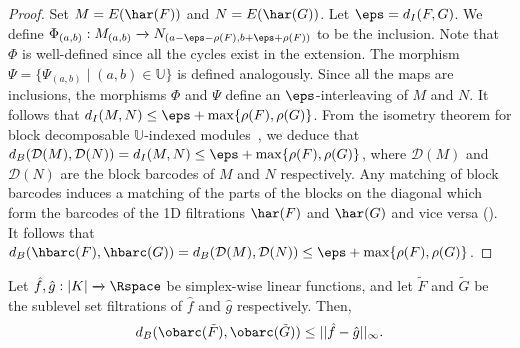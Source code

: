 \begin{proof}
    
    Set $M=E(\har(F))$ and $N=E(\har(G))$.  Let $\eps = d_{I}(F,G)$. We define $\Phi_{(a,b)}: M_{(a,b)} \xrightarrow{} N_{(a-\eps-\rho(F), b+\eps+\rho(F))}$ to be the inclusion. Note that $\Phi$ is well-defined since all the cycles exist in the extension. %
    The morphism $\Psi = \{ \Psi_{(a,b)}\mid (a,b)\in \mathbb{U} \}$ is defined analogously. Since all the maps are inclusions, the morphisms $\Phi$ and $\Psi$ define an $\eps$-interleaving of $M$ and $N$. It follows that $d_I (M,N) \leq \eps+\max \{\rho(F), \rho(G) \}$.
    From the isometry theorem for block decomposable $\mathbb{U}$-indexed modules~\cite{bjerkevik2021stability,botnan2018algebraic}, we deduce that $d_B( {\mathcal{D}} (M), {\mathcal{D}} (N)) = d_I(M,N) \leq \eps +\max \{\rho(F), \rho(G) \}$, where ${\mathcal{D}}(M)$ and ${\mathcal{D}}(N)$ are the block barcodes of $M$ and $N$ respectively. Any matching of block barcodes induces a matching of the parts of the blocks on the diagonal which form the barcodes of the 1D filtrations $\har(F)$ and $\har(G)$ and vice versa (\cite[Proposition 4.2]{botnan2018algebraic}). It follows that $d_B (\hbarc(F), \hbarc(G)) = d_B( {\mathcal{D}} (M), {\mathcal{D}} (N))  \leq \eps + \max \{\rho(F), \rho(G)\}$. 
\end{proof}



\begin{corollary}
Let $\hat{f}, \hat{g} : |K| \xrightarrow{} \Rspace$ be simplex-wise linear functions, and let $\tilde{F}$ and $\tilde{G}$ be the sublevel set filtrations of $\hat{f}$ and $\hat{g}$ respectively. Then, $$d_{B}({\obarc(\tilde{F})}, {\obarc(\tilde{G}})) \leq || \hat{f}-\hat{g}||_{\infty}.$$
\end{corollary}

